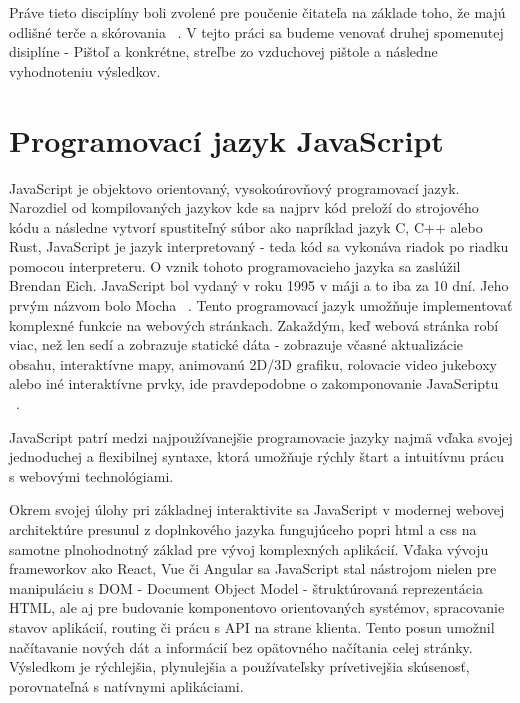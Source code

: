 Práve tieto disciplíny boli zvolené pre poučenie čitateľa na základe toho, že majú odlišné terče a
skórovania ~\cite{roberts2024understanding}. V tejto práci sa budeme venovať druhej spomenutej disiplíne - Pištoľ a konkrétne, streľbe zo vzduchovej pištole
a následne vyhodnoteniu výsledkov.


\section {Programovací jazyk JavaScript}
JavaScript je objektovo orientovaný, vysokoúrovňový programovací jazyk. Narozdiel od kompilovaných jazykov kde
sa najprv kód preloží do strojového kódu a následne vytvorí spustiteľný súbor ako napríklad jazyk C, C++ alebo Rust, JavaScript 
je jazyk interpretovaný - teda kód sa vykonáva riadok po riadku pomocou interpreteru.
O vznik tohoto programovacieho jazyka sa zaslúžil Brendan Eich. JavaScript bol vydaný v roku 1995 v máji a to iba za 
10 dní. Jeho prvým názvom bolo Mocha ~\cite{geeksforgeeks_js}. 
Tento programovací jazyk umožňuje implementovať komplexné funkcie na webových stránkach. Zakaždým, keď webová
stránka robí viac, než len sedí a zobrazuje statické dáta - zobrazuje včasné aktualizácie obsahu, interaktívne mapy,
animovanú 2D/3D grafiku, rolovacie video jukeboxy alebo iné interaktívne prvky, ide pravdepodobne o zakomponovanie JavaScriptu ~\cite{mdn_js}. 

JavaScript patrí medzi najpoužívanejšie programovacie jazyky najmä vďaka svojej jednoduchej a flexibilnej syntaxe, ktorá umožňuje rýchly štart 
a intuitívnu prácu s webovými technológiami.

Okrem svojej úlohy pri základnej interaktivite sa JavaScript v modernej webovej architektúre presunul z doplnkového jazyka fungujúceho popri 
html a css na samotne plnohodnotný základ pre vývoj komplexných aplikácií. Vďaka vývoju frameworkov ako React, Vue či Angular sa JavaScript 
stal nástrojom nielen pre manipuláciu s DOM - Document Object Model - štruktúrovaná reprezentácia HTML, ale aj pre budovanie komponentovo 
orientovaných systémov, spracovanie stavov aplikácií, routing či prácu s API na strane klienta. Tento posun umožnil načítavanie nových
dát a informácií bez opätovného načítania celej stránky. Výsledkom je rýchlejšia, plynulejšia a používateľsky prívetivejšia skúsenosť, 
porovnateľná s natívnymi aplikáciami.

